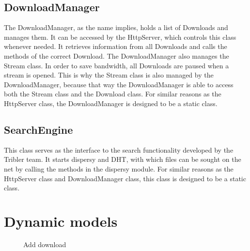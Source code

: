 \subsection{DownloadManager}
The DownloadManager, as the name implies, holds a list of Downloads and manages them. It can be accessed by the HttpServer, which controls this
class whenever needed. It retrieves information from all Downloads and calls the methods of the correct Download. The DownloadManager also manages
 the Stream class. In order to save bandwidth, all Downloads are paused when a stream is opened. This is why the Stream class is also managed by
 the DownloadManager, because that way the DownloadManager is able to access both the Stream class and the Download class. For similar reasons as
 the HttpServer class, the DownloadManager is designed to be a static class.

\subsection{SearchEngine}
This class serves as the interface to the search functionality developed by the Tribler team. It starts dispersy and DHT,
with which files can be sought on the net by calling the methods in the dispersy module. For similar reasons as the HttpServer class and
DownloadManager class, this class is designed to be a static class.

\newpage
\section{Dynamic models}

\begin{figure}[h!]
\label{fig:seq1}
\caption{Add download}
\end{figure}

